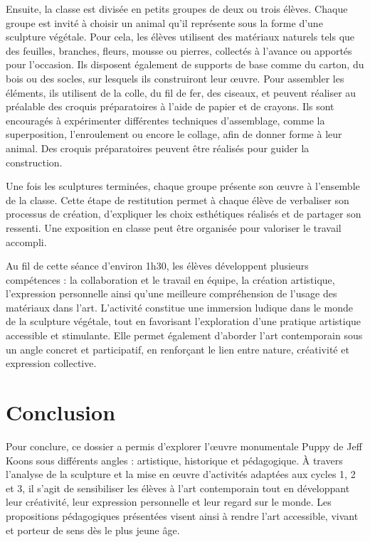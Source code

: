 \documentclass[12pt]{article}
\begin{document}
Ensuite, la classe est divisée en petits groupes de deux ou trois élèves. Chaque groupe est invité à choisir un animal qu’il représente sous la forme d’une sculpture végétale. Pour cela, les élèves utilisent des matériaux naturels tels que des feuilles, branches, fleurs, mousse ou pierres, collectés à l’avance ou apportés pour l’occasion. Ils disposent également de supports de base comme du carton, du bois ou des socles, sur lesquels ils construiront leur œuvre. Pour assembler les éléments, ils utilisent de la colle, du fil de fer, des ciseaux, et peuvent réaliser au préalable des croquis préparatoires à l’aide de papier et de crayons. Ils sont encouragés à expérimenter différentes techniques d’assemblage, comme la superposition, l’enroulement ou encore le collage, afin de donner forme à leur animal. Des croquis préparatoires peuvent être réalisés pour guider la construction.

Une fois les sculptures terminées, chaque groupe présente son œuvre à l’ensemble de la classe. Cette étape de restitution permet à chaque élève de verbaliser son processus de création, d’expliquer les choix esthétiques réalisés et de partager son ressenti. Une exposition en classe peut être organisée pour valoriser le travail accompli.

Au fil de cette séance d’environ 1h30, les élèves développent plusieurs compétences : la collaboration et le travail en équipe, la création artistique, l’expression personnelle ainsi qu’une meilleure compréhension de l’usage des matériaux dans l’art. L’activité constitue une immersion ludique dans le monde de la sculpture végétale, tout en favorisant l’exploration d’une pratique artistique accessible et stimulante. Elle permet également d’aborder l’art contemporain sous un angle concret et participatif, en renforçant le lien entre nature, créativité et expression collective.


\section{Conclusion}

Pour conclure, ce dossier a permis d’explorer l’œuvre monumentale Puppy de Jeff Koons sous différents angles : artistique, historique et pédagogique. À travers l’analyse de la sculpture et la mise en œuvre d’activités adaptées aux cycles 1, 2 et 3, il s’agit de sensibiliser les élèves à l’art contemporain tout en développant leur créativité, leur expression personnelle et leur regard sur le monde. Les propositions pédagogiques présentées visent ainsi à rendre l’art accessible, vivant et porteur de sens dès le plus jeune âge.
\end{document}
